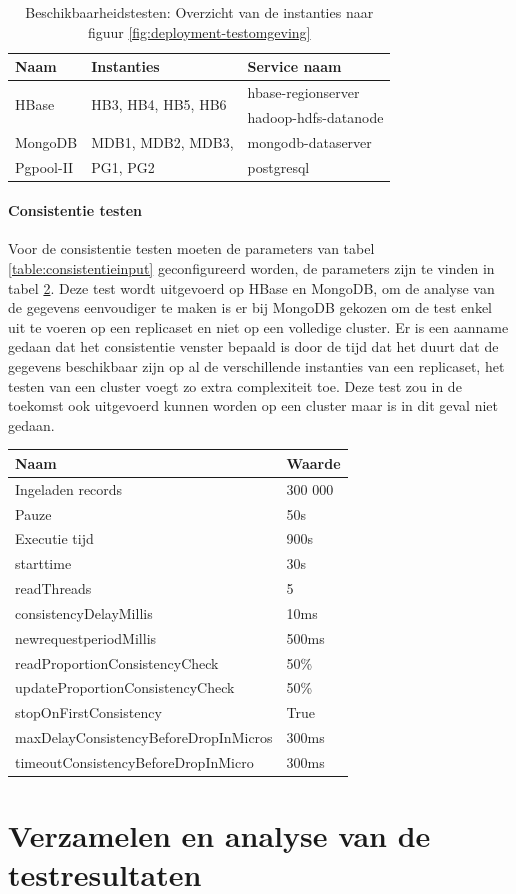 \begin{table}[h!]
	\centering
	\begin{tabular}{l| l l }
		\textbf{Naam} & \textbf{Instanties} & \textbf{Service naam} \\
		\hline
		\multirow{2}{*}{HBase}  & \multirow{2}{*}{HB3, HB4, HB5, HB6} & hbase-regionserver \\
		& & hadoop-hdfs-datanode \\
		MongoDB  & MDB1, MDB2, MDB3, & mongodb-dataserver\\
		Pgpool-II  & PG1, PG2 & postgresql \\
	\end{tabular}
	\caption{Beschikbaarheidstesten: Overzicht van de instanties naar figuur \ref{fig:deployment-testomgeving}}
	\label{table:beschikbaarheidstesten-nodes}
\end{table}

\paragraph{Consistentie testen} Voor de consistentie testen moeten de parameters van tabel \ref{table:consistentieinput} geconfigureerd worden, de parameters zijn te vinden in tabel \ref{table:consistentie-testen-parameters}. Deze test wordt uitgevoerd op HBase en MongoDB, om de analyse van de gegevens eenvoudiger te maken is er bij MongoDB gekozen om de test enkel uit te voeren op een replicaset en niet op een volledige cluster. Er is een aanname gedaan dat het consistentie venster bepaald is door de tijd dat het duurt dat de gegevens beschikbaar zijn op al de verschillende instanties van een replicaset, het testen van een cluster voegt zo extra complexiteit toe. Deze test zou in de toekomst ook uitgevoerd kunnen worden op een cluster maar is in dit geval niet gedaan.  

\begin{table}[t]
	\centering
		\begin{tabular}{l|l}
			\textbf{Naam} & \textbf{Waarde} \\ \hline
			Ingeladen records  & 300 000 \\
			Pauze & 50s \\
			Executie tijd & 900s \\	
			starttime & 30s \\
			readThreads & 5 \\ 
			consistencyDelayMillis & 10ms \\ 
			newrequestperiodMillis & 500ms \\ 
			readProportionConsistencyCheck & 50\% \\ 
			updateProportionConsistencyCheck & 50\% \\ 
			stopOnFirstConsistency & True \\ 
			maxDelayConsistencyBeforeDropInMicros & 300ms \\ 
			timeoutConsistencyBeforeDropInMicro & 300ms \\
		\end{tabular} 
	\label{table:consistentie-testen-parameters}
\end{table}

\section{Verzamelen en analyse van de testresultaten}


